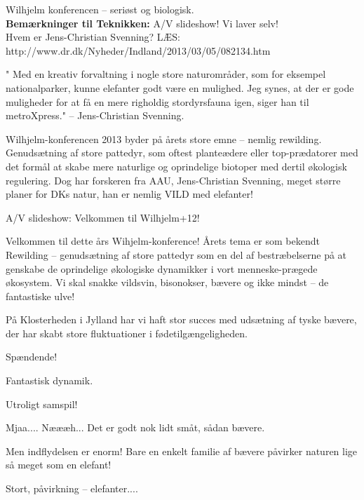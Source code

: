 \documentclass[a4paper,12pt]{article}
\begin{document}
\begin{sketch}



 Wilhjelm konferencen -- seriøst og biologisk.
\\
\textbf{Bemærkninger til Teknikken:}
A/V slideshow! Vi laver selv!
\\


Hvem er Jens-Christian Svenning? LÆS: http://www.dr.dk/Nyheder/Indland/2013/03/05/082134.htm


"  Med en kreativ forvaltning i nogle store naturområder, som for eksempel nationalparker, kunne elefanter godt være en mulighed. Jeg synes, at der er gode muligheder for at få en mere righoldig stordyrsfauna igen, siger han til metroXpress." -- Jens-Christian Svenning.

Wilhjelm-konferencen 2013 byder på årets store emne -- nemlig rewilding. Genudsætning af store pattedyr, som oftest planteædere eller top-prædatorer med det formål at skabe mere naturlige og oprindelige biotoper med dertil økologisk regulering.
Dog har forskeren fra AAU, Jens-Christian Svenning, meget større planer for DKs natur, han er nemlig VILD med elefanter!

A/V slideshow: Velkommen til Wilhjelm+12!

 Velkommen til dette års Wihjelm-konference! Årets tema er som bekendt Rewilding -- genudsætning af store pattedyr som en del af bestræbelserne på at genskabe de oprindelige økologiske dynamikker i vort menneske-prægede økosystem. Vi skal snakke vildsvin, bisonokser, bævere og ikke mindst -- de fantastiske ulve!


 På Klosterheden i Jylland har vi haft stor succes med udsætning af tyske bævere, der har skabt store fluktuationer i fødetilgængeligheden.

 Spændende!

 Fantastisk dynamik.

 Utroligt samspil!

 Mjaa.... Næææh... Det er godt nok lidt småt, sådan bævere.

 Men indflydelsen er enorm! Bare en enkelt familie af bævere påvirker naturen lige så meget som en elefant!

 Stort, påvirkning -- elefanter....



\end{sketch}
\end{document}
